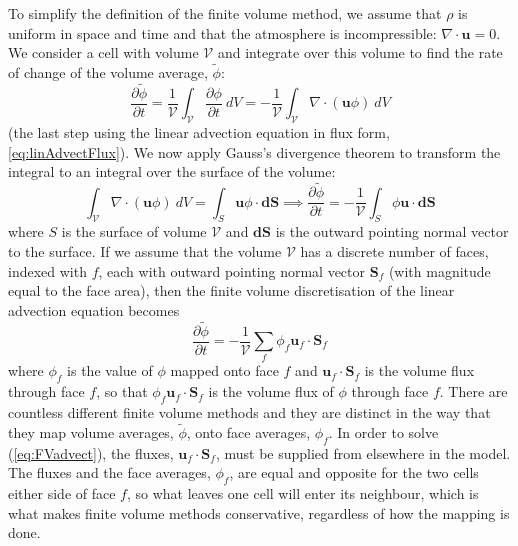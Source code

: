 To simplify the definition of the finite volume method, we assume
that $\rho$ is uniform in space and time and that the atmosphere
is incompressible: $\nabla\cdot\mathbf{u}=0$. We consider a cell
with volume $\mathcal{V}$ and integrate over this volume to find
the rate of change of the volume average, $\tilde{\phi}$:
\begin{equation}
\frac{\partial\tilde{\phi}}{\partial t}=\frac{1}{\mathcal{V}}\int_{\mathcal{V}}\frac{\partial\phi}{\partial t}\ dV=-\frac{1}{\mathcal{V}}\int_{\mathcal{V}}\nabla\cdot\left(\mathbf{u}\phi\right)\ dV
\end{equation}
(the last step using the linear advection equation in flux form, \ref{eq:linAdvectFlux}).
We now apply Gauss's divergence theorem to transform the integral
to an integral over the surface of the volume:
\begin{equation}
\int_{\mathcal{V}}\nabla\cdot\left(\mathbf{u}\phi\right)\ dV=\int_{S}\mathbf{u}\phi\cdot\mathbf{dS}\implies\frac{\partial\tilde{\phi}}{\partial t}=-\frac{1}{\mathcal{V}}\int_{S}\phi\mathbf{u}\cdot\mathbf{dS}
\end{equation}
where $S$ is the surface of volume $\mathcal{V}$ and $\mathbf{dS}$
is the outward pointing normal vector to the surface. If we assume
that the volume $\mathcal{V}$ has a discrete number of faces, indexed
with $f$, each with outward pointing normal vector $\mathbf{S}_{f}$
(with magnitude equal to the face area), then the finite volume discretisation
of the linear advection equation becomes
\begin{equation}
\frac{\partial\tilde{\phi}}{\partial t}=-\frac{1}{\mathcal{V}}\sum_{f}\phi_{f}\mathbf{u}_{f}\cdot\mathbf{S}_{f}\label{eq:FVadvect}
\end{equation}
where $\phi_{f}$ is the value of $\phi$ mapped onto face $f$ and
$\mathbf{u}_{f}\cdot\mathbf{S}_{f}$ is the volume flux through face
$f$, so that $\phi_{f}\mathbf{u}_{f}\cdot\mathbf{S}_{f}$ is the
volume flux of $\phi$ through face $f$. There are countless different
finite volume methods and they are distinct in the way that they map
volume averages, $\tilde{\phi}$, onto face averages, $\phi_{f}$.
In order to solve (\ref{eq:FVadvect}), the fluxes, $\mathbf{u}_{f}\cdot\mathbf{S}_{f}$,
must be supplied from elsewhere in the model. The fluxes and the face
averages, $\phi_{f}$, are equal and opposite for the two cells either
side of face $f$, so what leaves one cell will enter its neighbour,
which is what makes finite volume methods conservative, regardless
of how the mapping is done.


